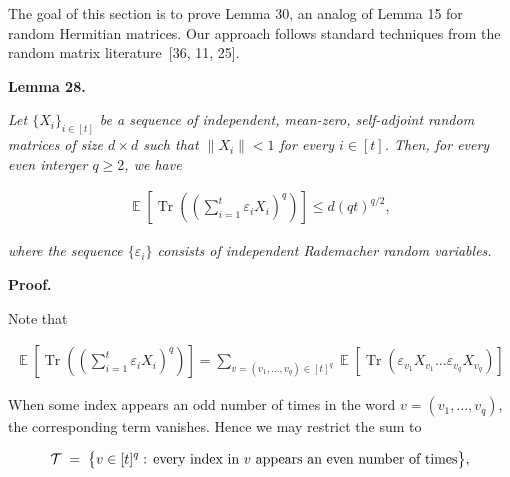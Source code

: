 The goal of this section is to prove Lemma 30, an analog of Lemma 15 for random Hermitian matrices. Our approach follows standard techniques from the random matrix literature [36, 11, 25].\par





\par\medskip\noindent\textbf{
\textbf{Lemma 28}\textbf{.}
}\par



\emph{Let $\{X_{i}\}_{i\in[t]}$ be a sequence of independent, mean-zero, self-adjoint random matrices of size $d\times d$ such that $\|X_{i}\|<1$ for every $i\in[t]$. Then, for every even interger $q\geq 2$, we have}\par


\[\begin{gathered}
\operatorname*{\mathbb{E}}\left[\operatorname*{Tr}\left(\left(\sum_{i=1}^{t}\varepsilon_{i}X_{i}\right)^{q}\right)\right]\leq d(qt)^{q/2},
\end{gathered}\]


\emph{where the sequence $\{\varepsilon_{i}\}$ consists of independent Rademacher random variables.}\par






\par\medskip\noindent\textbf{Proof.}\par




Note that\par


\[\begin{gathered}
\operatorname*{\mathbb{E}}\left[\operatorname*{Tr}\left(\left(\sum_{i=1}^{t}\varepsilon_{i}X_{i}\right)^{q}\right)\right]=\sum_{v=(v_{1},\dots,v_{q})\in[t]^{q}}\operatorname*{\mathbb{E}}\left[\operatorname*{Tr}(\varepsilon_{v_{1}}X_{v_{1}}\dots\varepsilon_{v_{q}}X_{v_{q}})\right]
\end{gathered}\]


When some index appears an odd number of times in the word
$v=(v_{1},\dots,v_{q})$, the corresponding term vanishes.
Hence we may restrict the sum to\par


\[\begin{gathered}
\mathcal{T}\;=\;\bigl{\{}v\in[t]^{q}:\,\text{every index in $v$ appears an even number of times}\bigr{\}},
\end{gathered}\]


